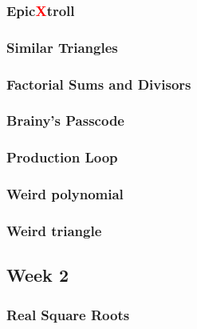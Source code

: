 \documentclass[titlepage=true]{scrartcl}
\begin{document}
        \subsubsection{Epic\textcolor{red}{X}troll}
        \label{10-1-1}
        
        \newpage

        \subsubsection{Similar Triangles}
        \label{10-1-2}  
        
        \newpage

        \subsubsection{Factorial Sums and Divisors}
        \label{10-1-3}  
        
        \newpage

        \subsubsection{Brainy's Passcode}
        \label{10-1-4}  
        
        \newpage

        \subsubsection{Production Loop}
        \label{10-1-5}  
        
        \newpage

        \subsubsection{Weird polynomial}
        \label{10-1-6}  
        
        \newpage
		
		\subsubsection{Weird triangle}
		\label{10-1-7}
		
		\newpage

    \subsection{Week 2}

        \subsubsection{Real Square Roots}
        \label{10-2-1}  
        
        \newpage
\end{document}
